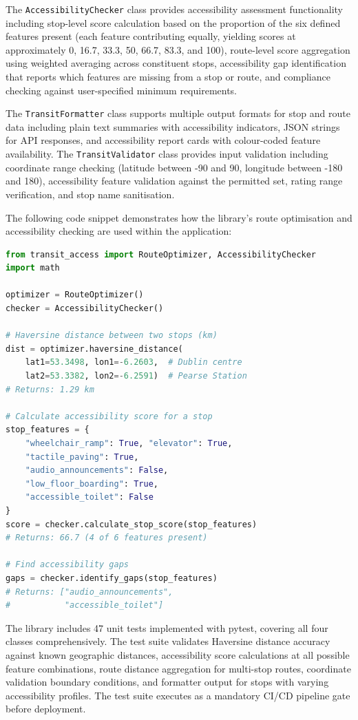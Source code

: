\documentclass[conference]{IEEEtran}
\begin{document}
The \texttt{AccessibilityChecker} class provides accessibility assessment functionality including stop-level score calculation based on the proportion of the six defined features present (each feature contributing equally, yielding scores at approximately 0, 16.7, 33.3, 50, 66.7, 83.3, and 100), route-level score aggregation using weighted averaging across constituent stops, accessibility gap identification that reports which features are missing from a stop or route, and compliance checking against user-specified minimum requirements.

The \texttt{TransitFormatter} class supports multiple output formats for stop and route data including plain text summaries with accessibility indicators, JSON strings for API responses, and accessibility report cards with colour-coded feature availability. The \texttt{TransitValidator} class provides input validation including coordinate range checking (latitude between -90 and 90, longitude between -180 and 180), accessibility feature validation against the permitted set, rating range verification, and stop name sanitisation.

The following code snippet demonstrates how the library's route optimisation and accessibility checking are used within the application:

\begin{lstlisting}[language=Python, caption={RouteOptimizer and AccessibilityChecker usage}]
from transit_access import RouteOptimizer, AccessibilityChecker
import math

optimizer = RouteOptimizer()
checker = AccessibilityChecker()

# Haversine distance between two stops (km)
dist = optimizer.haversine_distance(
    lat1=53.3498, lon1=-6.2603,  # Dublin centre
    lat2=53.3382, lon2=-6.2591)  # Pearse Station
# Returns: 1.29 km

# Calculate accessibility score for a stop
stop_features = {
    "wheelchair_ramp": True, "elevator": True,
    "tactile_paving": True,
    "audio_announcements": False,
    "low_floor_boarding": True,
    "accessible_toilet": False
}
score = checker.calculate_stop_score(stop_features)
# Returns: 66.7 (4 of 6 features present)

# Find accessibility gaps
gaps = checker.identify_gaps(stop_features)
# Returns: ["audio_announcements",
#           "accessible_toilet"]
\end{lstlisting}

The library includes 47 unit tests implemented with pytest, covering all four classes comprehensively. The test suite validates Haversine distance accuracy against known geographic distances, accessibility score calculations at all possible feature combinations, route distance aggregation for multi-stop routes, coordinate validation boundary conditions, and formatter output for stops with varying accessibility profiles. The test suite executes as a mandatory CI/CD pipeline gate before deployment.
\end{document}
